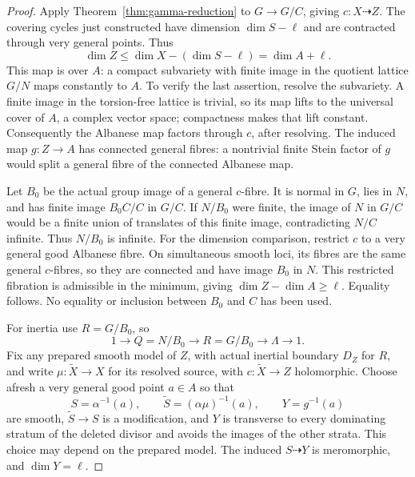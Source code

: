 \begin{proof}
Apply Theorem~\ref{thm:gamma-reduction} to \(G\to G/C\), giving
\(c:X\dashrightarrow Z\). The covering cycles just constructed
have dimension \(\dim S-\ell\) and are contracted through very
general points. Thus
\[
 \dim Z\le\dim X-(\dim S-\ell)=\dim A+\ell.
\]
This map is over \(A\): a compact
subvariety with finite image in the quotient lattice
\(G/N\) maps constantly to \(A\). To verify the last assertion,
resolve the subvariety. A finite image in the torsion-free lattice
is trivial, so its map lifts to the universal cover of \(A\),
a complex vector space; compactness makes that lift constant.
Consequently the Albanese map factors through \(c\), after
resolving. The induced map \(g:Z\to A\) has connected general
fibres: a nontrivial finite Stein factor of \(g\) would split a
general fibre of the connected Albanese map.

Let \(B_0\) be the actual group image of a general \(c\)-fibre.
It is normal in \(G\), lies in \(N\), and has finite image
\(B_0C/C\) in \(G/C\). If \(N/B_0\) were finite, the image of
\(N\) in \(G/C\) would be a finite union of translates of this
finite image, contradicting \(N/C\) infinite. Thus \(N/B_0\)
is infinite. For the dimension comparison, restrict \(c\) to a
very general good Albanese fibre. On simultaneous smooth loci,
its fibres are the same general \(c\)-fibres, so they are connected
and have image \(B_0\) in \(N\). This restricted fibration is
admissible in the minimum, giving \(\dim Z-\dim A\ge\ell\).
Equality follows. No equality or inclusion between \(B_0\) and
\(C\) has been used.

For inertia use \(R=G/B_0\), so
\[
 1\longrightarrow Q=N/B_0\longrightarrow R=G/B_0
 \longrightarrow\Lambda\longrightarrow1.
\]
Fix any prepared smooth model of \(Z\), with actual inertial
boundary \(D_Z\) for \(R\), and write \(\mu:\widetilde X\to X\)
for its resolved source, with \(c:\widetilde X\to Z\) holomorphic.
Choose afresh a very general good point
\(a\in A\) so that
\[
 S=\alpha^{-1}(a),\qquad
 \widetilde S=(\alpha\mu)^{-1}(a),\qquad Y=g^{-1}(a)
\]
are smooth, \(\widetilde S\to S\) is a modification, and \(Y\)
is transverse to every dominating stratum of the deleted divisor
and avoids the images of the other strata. This choice may depend
on the prepared model. The induced \(S\dashrightarrow Y\) is
meromorphic, and \(\dim Y=\ell\).


\end{proof}
